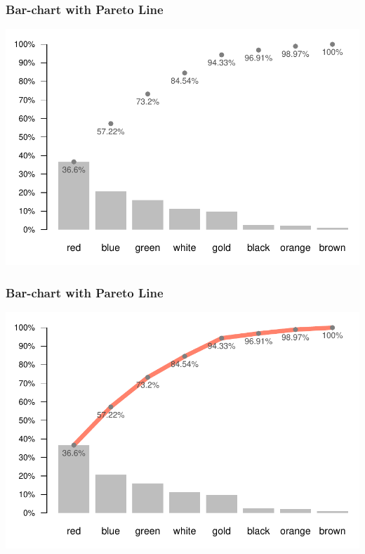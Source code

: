 \documentclass[12pt]{beamer}\usepackage[]{graphicx}\usepackage[]{color}
\newenvironment{knitrout}{}{} %
\begin{document}

\begin{frame}[fragile]
\frametitle{Bar-chart with Pareto Line}

\begin{knitrout}\footnotesize
{}\color{fgcolor}

{\centering \includegraphics[width=.8\linewidth,height=.6\linewidth]{figure/unnamed-chunk-12-1} 

}



\end{knitrout}

\end{frame}


\begin{frame}[fragile]
\frametitle{Bar-chart with Pareto Line}

\begin{knitrout}\footnotesize
{}\color{fgcolor}

{\centering \includegraphics[width=.8\linewidth,height=.6\linewidth]{figure/unnamed-chunk-13-1} 

}



\end{knitrout}

\end{frame}
\end{document}
